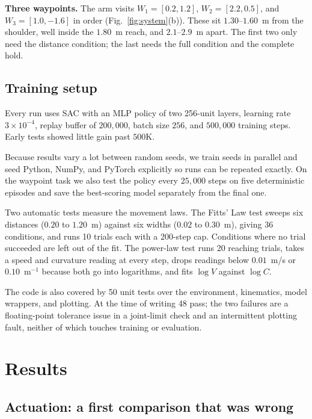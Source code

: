 \documentclass[conference]{IEEEtran}
\begin{document}
\textbf{Three waypoints.} The arm visits $W_1 = [0.2, 1.2]$, $W_2 = [2.2,
0.5]$, and $W_3 = [1.0, -1.6]$ in order (Fig.~\ref{fig:system}(b)). These sit
$1.30$--$1.60$~m from the shoulder, well inside the $1.80$~m reach, and
$2.1$--$2.9$~m apart. The first two only need the distance condition; the last
needs the full condition and the complete hold.

\subsection{Training setup}

Every run uses SAC with an MLP policy of two 256-unit layers, learning rate
$3\times10^{-4}$, replay buffer of $200{,}000$, batch size $256$, and
$500{,}000$ training steps. Early tests showed little gain past $500$K.

Because results vary a lot between random seeds, we train seeds in parallel and
seed Python, NumPy, and PyTorch explicitly so runs can be repeated exactly. On
the waypoint task we also test the policy every $25{,}000$ steps on five
deterministic episodes and save the best-scoring model separately from the
final one.

Two automatic tests measure the movement laws. The Fitts' Law test sweeps six
distances ($0.20$ to $1.20$~m) against six widths ($0.02$ to $0.30$~m), giving
36 conditions, and runs 10 trials each with a 200-step cap. Conditions where no
trial succeeded are left out of the fit. The power-law test runs 20 reaching
trials, takes a speed and curvature reading at every step, drops readings below
$0.01$~m/s or $0.10$~m$^{-1}$ because both go into logarithms, and fits $\log
V$ against $\log C$.

The code is also covered by 50 unit tests over the environment, kinematics,
model wrappers, and plotting. At the time of writing 48 pass; the two failures
are a floating-point tolerance issue in a joint-limit check and an intermittent
plotting fault, neither of which touches training or evaluation.

\section{Results}
\label{sec:results}

\subsection{Actuation: a first comparison that was wrong}
\end{document}
